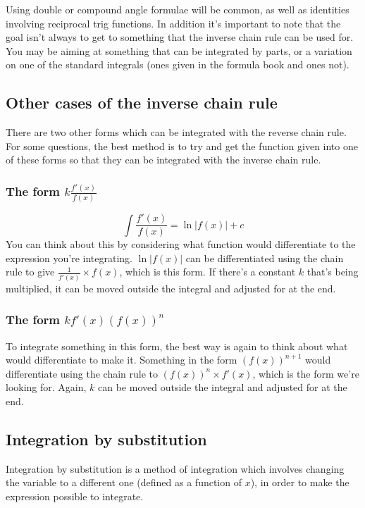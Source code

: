 Using double or compound angle formulae will be common, as well as identities involving reciprocal trig functions. In addition it's important to note that the goal isn't always to get to something that the inverse chain rule can be used for. You may be aiming at something that can be integrated by parts, or a variation on one of the standard integrals (ones given in the formula book and ones not).

\subsection{Other cases of the inverse chain rule}
There are two other forms which can be integrated with the reverse chain rule. For some questions, the best method is to try and get the function given into one of these forms so that they can be integrated with the inverse chain rule.

\subsubsection{The form $k\frac{f'(x)}{f(x)}$}
\begin{equation}
	\int \frac{f'(x)}{f(x)} = \ln|f(x)|+c
\end{equation}
You can think about this by considering what function would differentiate to the expression you're integrating. $\ln|f(x)|$ can be differentiated using the chain rule to give $\frac{1}{f'(x)} \times f(x)$, which is this form. If there's a constant $k$ that's being multiplied, it can be moved outside the integral and adjusted for at the end.

\subsubsection{The form $kf'(x)(f(x))^n$}
To integrate something in this form, the best way is again to think about what would differentiate to make it. Something in the form $(f(x))^{n+1}$ would differentiate using the chain rule to $(f(x))^n \times f'(x)$, which is the form we're looking for. Again, $k$ can be moved outside the integral and adjusted for at the end.

\subsection{Integration by substitution}
Integration by substitution is a method of integration which involves changing the variable to a different one (defined as a function of $x$), in order to make the expression possible to integrate.

